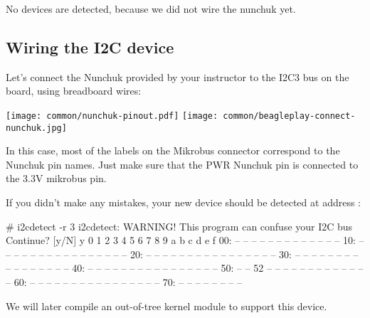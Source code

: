No devices are detected, because we did not wire the nunchuk yet.

\subsection{Wiring the I2C device}

Let's connect the Nunchuk provided by your instructor
to the I2C3 bus on the board, using breadboard wires:

\texttt{[image: common/nunchuk-pinout.pdf]}
\texttt{[image: common/beagleplay-connect-nunchuk.jpg]}

In this case, most of the labels on the Mikrobus connector correspond to the
Nunchuk pin names. Just make sure that the PWR Nunchuk pin is connected to the
3.3V mikrobus pin.

If you didn't make any mistakes, your new device should be detected at
address :

\begin{bashinput}
# i2cdetect -r 3
i2cdetect: WARNING! This program can confuse your I2C bus
Continue? [y/N] y
     0  1  2  3  4  5  6  7  8  9  a  b  c  d  e  f
00:          -- -- -- -- -- -- -- -- -- -- -- -- --
10: -- -- -- -- -- -- -- -- -- -- -- -- -- -- -- --
20: -- -- -- -- -- -- -- -- -- -- -- -- -- -- -- --
30: -- -- -- -- -- -- -- -- -- -- -- -- -- -- -- --
40: -- -- -- -- -- -- -- -- -- -- -- -- -- -- -- --
50: -- -- 52 -- -- -- -- -- -- -- -- -- -- -- -- --
60: -- -- -- -- -- -- -- -- -- -- -- -- -- -- -- --
70: -- -- -- -- -- -- -- --
\end{bashinput}

We will later compile an out-of-tree kernel module to support this device.
